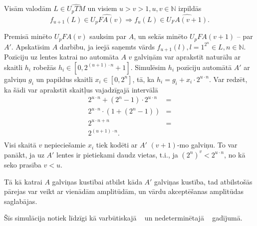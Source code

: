 \documentclass{ludis}
\begin{document}
\begin{lemma} \label{plus1}
Visām valodām $L \in \widehat{U_pTM}$ un visiem $u > v > 1, u, v \in \mathbb{N}$ izpildās
\[
	f_{u+1}(L) \in \widehat{U_pFA(v)} \Rightarrow f_u(L) \in \widehat{U_FA(v + 1)}.
\]
\end{lemma}
\begin{pieradijums}
Premisā minēto $U_pFA(v)$ sauksim par $A$, un sekās minēto $U_pFA(v + 1)$ -- par $A'$. %
Apskatīsim $A$ darbību, ja ieejā saņemts vārds $f_{u+1}(l), l = 1^{2^n} \in L, n \in \mathbb{N}$. Pozīciju uz lentes katrai no automāta $A$ $v$ galviņām var aprakstīt naturālu ar skaitli $h_i$ robežās $h_i \in \left[0, 2^{(u + 1) \cdot n} + 1 \right]$. Simulēsim $h_i$ pozīciju automātā $A'$ ar galviņu $g_i$ un papildus skaitli $x_i \in \left[ 0, 2^n \right]$, tā, ka $h_i = g_i + x_i \cdot 2^{u \cdot n}$. Var redzēt, ka šādi var aprakstīt skaitļus vajadzīgajā intervālā
\begin{align*}
	2^{u \cdot n} + (2^n - 1) \cdot 2^{u \cdot n} & =\\
	2^{u \cdot n} \cdot (1 + (2^n - 1)) & =\\
	2^{u \cdot n + n} & =\\
	2^{(u + 1) \cdot n}.\\
\end{align*}
Visi skaitā $v$ nepieciešamie $x_i$ tiek kodēti ar $A'$ $(v+1)$-mo galviņu. To var panākt, ja uz $A'$ lentes ir pietiekami daudz vietas, t.i., ja $(2^n)^v < 2^{u \cdot n}$, no kā seko prasība $v < u$.

Tā kā katrai $A$ galviņas kustībai atbilst kāda $A'$ galviņas kustība, tad atbilstošās pārejas var veikt ar vienādām amplitūdām, un vārdu akceptēšanas amplitūdas saglabājas.

Šīs simulācija notiek līdzīgi kā varbūtiskajā ~\citep{Macarie1995} un nedeterminētajā ~\citep{Monien1980} gadījumā.
\end{pieradijums}
\end{document}
